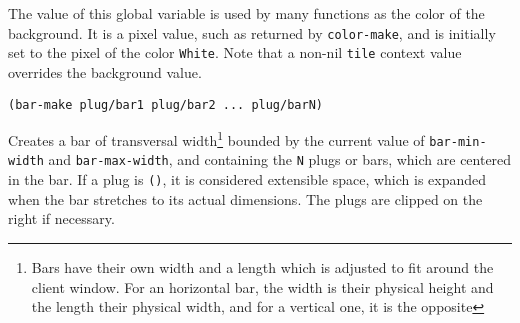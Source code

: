         

The value of this global variable is used by many functions as the color of
the background. It is a pixel value, such as returned by \verb"color-make",
and is initially set to the pixel of the color \verb"White".  Note that
a non-nil \verb"tile" context value overrides the background value.

        
{\usagefont\begin{verbatim}
(bar-make plug/bar1 plug/bar2 ... plug/barN)
\end{verbatim}}\usageupspace

Creates a bar of transversal width\footnote{Bars have their own width and a
length which is adjusted to fit around the client window. For an horizontal
bar, the width is their physical height and the length their physical width,
and for a vertical one, it is the opposite} bounded by the current value
of \verb"bar-min-width" and \verb"bar-max-width", and containing the {\tt N}
plugs or bars, which are centered in the bar.  If a plug is \verb"()", it is
considered extensible space, which is expanded when the bar stretches to its
actual dimensions.  The plugs are clipped on the right if necessary.



